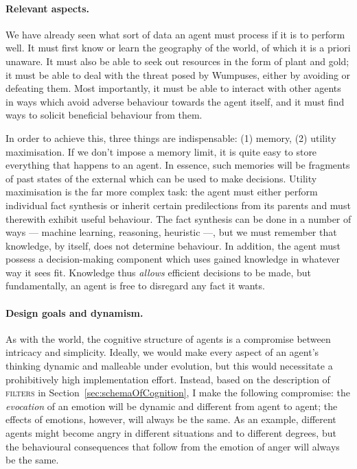 \paragraph{Relevant aspects.} We have already seen what sort of data an agent must process if it is to perform well. It must first know or learn the geography of the world, of which it is a priori unaware. It must also be able to seek out resources in the form of plant and gold; it must be able to deal with the threat posed by Wumpuses, either by avoiding or defeating them. Most importantly, it must be able to interact with other agents in ways which avoid adverse behaviour towards the agent itself, and it must find ways to solicit beneficial behaviour from them.

In order to achieve this, three things are indispensable: (1) memory, (2) utility maximisation. If we don't impose a memory limit, it is quite easy to store everything that happens to an agent. In essence, such memories will be fragments of past states of the external which can be used to make decisions. Utility maximisation is the far more complex task: the agent must either perform individual fact synthesis or inherit certain predilections from its parents and must therewith exhibit useful behaviour. The fact synthesis can be done in a number of ways --- machine learning, reasoning, heuristic ---, but we must remember that knowledge, by itself, does not determine behaviour. In addition, the agent must possess a decision-making component which uses gained knowledge in whatever way it sees fit. Knowledge thus  {\em allows} efficient decisions to be made, but fundamentally, an agent is free to disregard any fact it wants.

\paragraph{Design goals and dynamism.} As with the world, the cognitive structure of agents is a compromise between intricacy and simplicity. Ideally, we would make every aspect of an agent's thinking dynamic and malleable under evolution, but this would necessitate a prohibitively high implementation effort. Instead, based on the description of \textsc{filters} in Section~\ref{sec:schemaOfCognition}, I make the following compromise: the {\em evocation} of an emotion will be dynamic and different from agent to agent; the effects of emotions, however, will always be the same. As an example, different agents might become angry in different situations and to different degrees, but the behavioural consequences that follow from the emotion of anger will always be the same.

